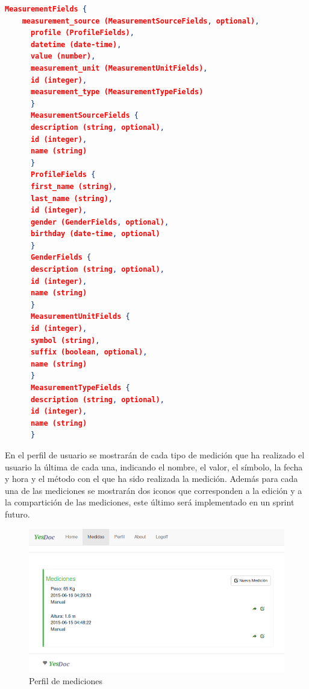     \begin{lstlisting}[language=json,firstnumber=1]
          MeasurementFields {
	measurement_source (MeasurementSourceFields, optional),
      profile (ProfileFields),
      datetime (date-time),
      value (number),
      measurement_unit (MeasurementUnitFields),
      id (integer),
      measurement_type (MeasurementTypeFields)
      }
      MeasurementSourceFields {
      description (string, optional),
      id (integer),
      name (string)
      }
      ProfileFields {
      first_name (string),
      last_name (string),
      id (integer),
      gender (GenderFields, optional),
      birthday (date-time, optional)
      }
      GenderFields {
      description (string, optional),
      id (integer),
      name (string)
      }
      MeasurementUnitFields {
      id (integer),
      symbol (string),
      suffix (boolean, optional),
      name (string)
      }
      MeasurementTypeFields {
      description (string, optional),
      id (integer),
      name (string)
      } 
    \end{lstlisting}

    En el perfil de usuario se mostrarán de cada tipo de medición que ha realizado el usuario la última de cada una, indicando el nombre, el valor, el símbolo, la fecha y hora y el método con el que ha sido realizada la medición. Además para cada una de las mediciones se mostrarán dos iconos que corresponden a la edición y a la compartición de las mediciones, este último será implementado en un sprint futuro.

    \begin{figure}[h]
        \centering
        \includegraphics[width=1\textwidth]{img/2-perfil_medicion}
        \caption{Perfil de mediciones}
		\label{perfil_medicion}
    \end{figure}
    

